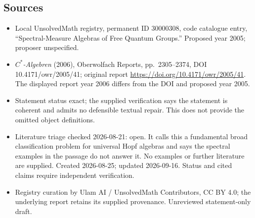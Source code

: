 \documentclass[11pt]{article}
\begin{document}
\subsection{Sources}
\begin{itemize}
\item Local UnsolvedMath registry, permanent ID 30000308, code catalogue entry, ``Spectral-Measure Algebras of Free Quantum Groups.'' Proposed year 2005; proposer unspecified.
\item \emph{$C^*$-Algebren} (2006), Oberwolfach Reports, pp.\ 2305--2374, DOI 10.4171/owr/2005/41; original report \url{https://doi.org/10.4171/owr/2005/41}. The displayed report year 2006 differs from the DOI and proposed year 2005.
\item Statement status exact; the supplied verification says the statement is coherent and admits no defensible textual repair. This does not provide the omitted object definitions.
\item Literature triage checked 2026-08-21: open. It calls this a fundamental broad classification problem for universal Hopf algebras and says the spectral examples in the passage do not answer it. No examples or further literature are supplied. Created 2026-08-25; updated 2026-09-16. Status and cited claims require independent verification.
\item Registry curation by Ulam AI / UnsolvedMath Contributors, CC BY 4.0; the underlying report retains its supplied provenance. Unreviewed statement-only draft.
\end{itemize}
\end{document}
